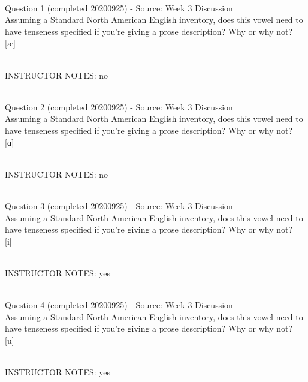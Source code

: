 \documentclass[12pt]{article}
\begin{document}
~\\

{\large Question 1} (completed 20200925) - Source: Week 3 Discussion\\

Assuming a Standard North American English inventory, does this vowel need to have tenseness specified if you're giving a prose description? Why or why not?\\

{[æ]}


~\\
INSTRUCTOR NOTES: no


~\\

{\large Question 2} (completed 20200925) - Source: Week 3 Discussion\\

Assuming a Standard North American English inventory, does this vowel need to have tenseness specified if you're giving a prose description? Why or why not?\\

{[ɑ]}


~\\
INSTRUCTOR NOTES: no


~\\

{\large Question 3} (completed 20200925) - Source: Week 3 Discussion\\

Assuming a Standard North American English inventory, does this vowel need to have tenseness specified if you're giving a prose description? Why or why not?\\

{[i]}


~\\
INSTRUCTOR NOTES: yes


~\\

{\large Question 4} (completed 20200925) - Source: Week 3 Discussion\\

Assuming a Standard North American English inventory, does this vowel need to have tenseness specified if you're giving a prose description? Why or why not?\\

{[u]}


~\\
INSTRUCTOR NOTES: yes


~\\
\end{document}
